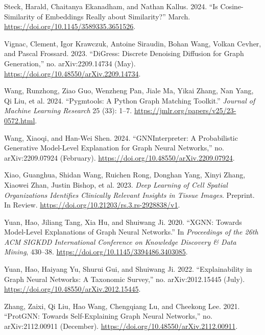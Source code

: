 \documentclass[
  11pt,
  letterpaper,
]{article}
\newlength{\cslhangindent}
\newlength{\cslentryspacingunit} %
\newenvironment{CSLReferences}[2] %
 {%
  \setlength{\parindent}{0pt}
  \ifodd #1
  \let\oldpar\par
  \def\par{\hangindent=\cslhangindent\oldpar}
  \fi
  \setlength{\parskip}{#2\cslentryspacingunit}
 }%
 {}
\begin{document}
\begin{CSLReferences}{1}{0}
\leavevmode{}%
Steck, Harald, Chaitanya Ekanadham, and Nathan Kallus. 2024. {``Is
Cosine-Similarity of Embeddings Really about Similarity?''} March.
\url{https://doi.org/10.1145/3589335.3651526}.

\leavevmode{}%
Vignac, Clement, Igor Krawczuk, Antoine Siraudin, Bohan Wang, Volkan
Cevher, and Pascal Frossard. 2023. {``DiGress: Discrete Denoising
Diffusion for Graph Generation,''} no. arXiv:2209.14734 (May).
\url{https://doi.org/10.48550/arXiv.2209.14734}.

\leavevmode{}%
Wang, Runzhong, Ziao Guo, Wenzheng Pan, Jiale Ma, Yikai Zhang, Nan Yang,
Qi Liu, et al. 2024. {``Pygmtools: A Python Graph Matching Toolkit.''}
\emph{Journal of Machine Learning Research} 25 (33): 1--7.
\url{https://jmlr.org/papers/v25/23-0572.html}.

\leavevmode{}%
Wang, Xiaoqi, and Han-Wei Shen. 2024. {``GNNInterpreter: A Probabilistic
Generative Model-Level Explanation for Graph Neural Networks,''} no.
arXiv:2209.07924 (February).
\url{https://doi.org/10.48550/arXiv.2209.07924}.

\leavevmode{}%
Xiao, Guanghua, Shidan Wang, Ruichen Rong, Donghan Yang, Xinyi Zhang,
Xiaowei Zhan, Justin Bishop, et al. 2023. \emph{Deep Learning of Cell
Spatial Organizations Identifies Clinically Relevant Insights in Tissue
Images}. Preprint. In Review.
\url{https://doi.org/10.21203/rs.3.rs-2928838/v1}.

\leavevmode{}%
Yuan, Hao, Jiliang Tang, Xia Hu, and Shuiwang Ji. 2020. {``XGNN: Towards
Model-Level Explanations of Graph Neural Networks.''} In
\emph{Proceedings of the 26th ACM SIGKDD International Conference on
Knowledge Discovery \& Data Mining}, 430--38.
\url{https://doi.org/10.1145/3394486.3403085}.

\leavevmode{}%
Yuan, Hao, Haiyang Yu, Shurui Gui, and Shuiwang Ji. 2022.
{``Explainability in Graph Neural Networks: A Taxonomic Survey,''} no.
arXiv:2012.15445 (July).
\url{https://doi.org/10.48550/arXiv.2012.15445}.

\leavevmode{}%
Zhang, Zaixi, Qi Liu, Hao Wang, Chengqiang Lu, and Cheekong Lee. 2021.
{``ProtGNN: Towards Self-Explaining Graph Neural Networks,''} no.
arXiv:2112.00911 (December).
\url{https://doi.org/10.48550/arXiv.2112.00911}.

\end{CSLReferences}
\end{document}
